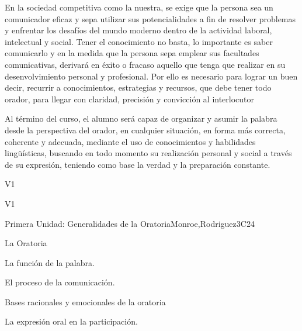 \begin{syllabus}


\begin{justification}
En la sociedad competitiva como la nuestra,  se exige que la persona sea un comunicador eficaz y  sepa utilizar sus potencialidades a fin de resolver problemas y enfrentar los desafíos del mundo moderno dentro de la actividad laboral, intelectual y social. Tener el conocimiento no basta, lo importante es saber comunicarlo y en la medida que la persona sepa emplear sus facultades comunicativas, derivará en éxito o fracaso aquello que tenga que realizar en su desenvolvimiento personal y profesional. Por ello es necesario para lograr un buen decir, recurrir a conocimientos, estrategias y recursos, que debe tener todo orador, para llegar con claridad, precisión y convicción al interlocutor
\end{justification}

\begin{goals}
\item Al término del curso, el alumno será capaz de organizar y asumir la palabra desde la perspectiva del orador, en cualquier situación, en forma más correcta, coherente  y adecuada, mediante el uso de conocimientos y habilidades lingüísticas, buscando en todo momento su realización personal y social  a través de su expresión, teniendo como base  la verdad y la preparación constante.
\end{goals}

\begin{outcomes}{V1}
    \item {}
    \item {}
    \item {}
\end{outcomes}

\begin{competences}{V1}
    \item {}
    \item {}
\end{competences}

\begin{unit}{}{Primera Unidad: Generalidades de la Oratoria}{Monroe,Rodriguez}{3}{C24}
\begin{topics}
	\item La Oratoria
	\item La función de la palabra.
	\item El proceso de la comunicación.
	\item Bases racionales y emocionales de la oratoria
		\begin{subtopics}
			\item La expresión oral en la participación.
		\end{subtopics}


\end{topics}
\end{unit}
\end{syllabus}
